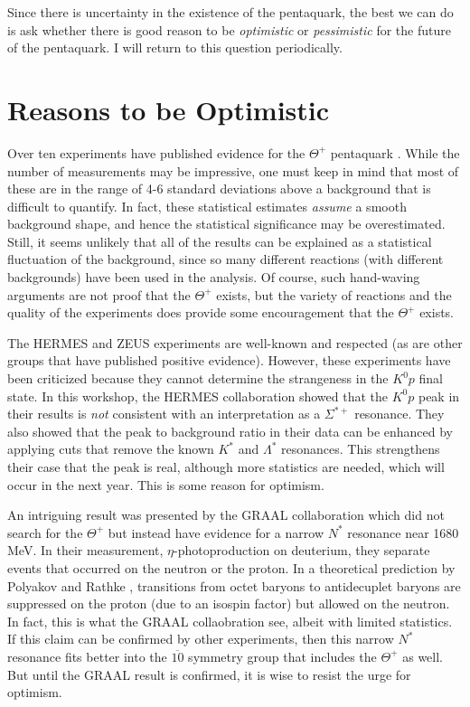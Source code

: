 \documentclass{ws-procs9x6}
\newcommand{\thp}{$\Theta^+$ }
\begin{document}
Since there is uncertainty in the existence 
of the pentaquark, the best we can do is ask whether there 
is good reason to be {\it optimistic} or {\it pessimistic} 
for the future of the pentaquark.  I will return to this 
question periodically.


\section{ Reasons to be Optimistic }

Over ten experiments have published evidence for the \thp pentaquark 
\cite{leps,diana,clas-d,clas-p,saphir,itep,hermes,zeus,na49,cosy,svd}.
While the number of measurements may be impressive, one must keep in 
mind that most of these are in the range of 4-6 standard deviations 
above a background that is difficult to quantify.  In fact, these 
statistical estimates {\it assume} a smooth background shape, and 
hence the statistical significance may be overestimated. Still, 
it seems unlikely that all of the results can be explained as a 
statistical fluctuation of the background, since so many different 
reactions (with different backgrounds) have been used in the analysis. 
Of course, such hand-waving arguments are not proof that the 
\thp exists, but the variety of reactions and the quality of 
the experiments does provide some encouragement that the \thp 
exists.

The HERMES and ZEUS experiments are well-known and respected (as 
are other groups that have published positive evidence).  However, 
these experiments have been criticized \cite{meson04} because they 
cannot determine the strangeness in the $K^0p$ final state.  In 
this workshop, the HERMES collaboration \cite{lorenzon} showed 
that the $K^0p$ peak in their results is {\it not} consistent with 
an interpretation as a $\Sigma^{*+}$ resonance.  They also showed 
that the peak to background ratio in their data can be enhanced by 
applying cuts that remove the known $K^*$ and $\Lambda^*$ resonances.
This strengthens their case that the peak is real, although more 
statistics are needed, which will occur in the next year. 
This is some reason for optimism.

An intriguing result was presented by the GRAAL collaboration
\cite{schaerf}
which did not search for the \thp but instead have evidence for a 
narrow $N^*$ resonance near 1680 MeV.  In their measurement, 
$\eta$-photoproduction on deuterium, they separate events that 
occurred on the neutron or the proton.  In a theoretical prediction 
by Polyakov and Rathke \cite{polyakov}, transitions from octet 
baryons to antidecuplet baryons are suppressed on the proton 
(due to an isospin factor) but allowed on the neutron.  In fact, 
this is what the GRAAL collaobration see, albeit with limited 
statistics.  If this claim can be confirmed by other experiments, 
then this narrow $N^*$ resonance fits better into the $\overline{10}$ 
symmetry group that includes the \thp as well.  But until the 
GRAAL result is confirmed, it is wise to resist the urge for optimism.
\end{document}

